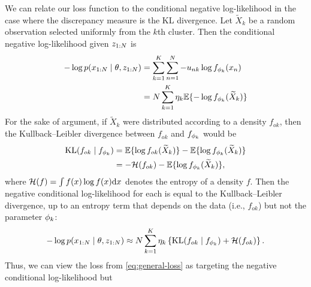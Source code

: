 We can relate our loss function to the conditional negative log-likelihood in the case where the discrepancy measure is the KL divergence.
Let $\widetilde{X}_{k}$ be a random observation selected uniformly from the $k$th cluster.
Then the conditional negative log-likelihood given $z_{1:N}$ is
\begin{align}
	-\log p(x_{1:\numobs} \mid \theta, z_{1:\numobs})
	 & = \sum_{k=1}^{\numcomps}\sum_{n=1}^N - u_{nk}\log f_{\param_{k}}(x_n)      \\
	 & = N \sum_{k=1}^{\numcomps} \eta_{k} \E\{-\log f_{\param_{k}}(\widetilde X_{k})\}
\end{align}
For the sake of argument, if $\widetilde{X}_{k}$ were distributed according to a density $f_{ok}$, then
the Kullback--Leibler divergence between $f_{ok}$ and $f_{\phi_{k}}$ would be
\[
	\begin{aligned}
		\kl{f_{ok}}{ f_{\param_{k}}}
		 & = \E\{\log f_{ok}(\widetilde X_{k})\} -  \E\{\log f_{\param_{k}}(\widetilde X_{k})\} \\
		 & = -\mathcal{H}(f_{ok}) -  \E\{\log f_{\param_{k}}(\widetilde X_{k})\},
	\end{aligned}
\]
where $\mathcal{H}(f) = \int f(x) \log f(x) \mathrm{d} x$ denotes the entropy of a density $f$.
Then the negative conditional log-likelihood for each is equal to the Kullback--Leibler divergence, up to an entropy term that depends on the data (i.e., $f_{ok}$) but not the parameter $\phi_{k}$:
\[
	-\log p(x_{1:N} \mid \theta, z_{1:N})
	\approx N \sum_{k=1}^{K}\eta_k\left\{ \mathrm{KL}(f_{ok} \mid  f_{\phi_{k}}) + \mathcal{H}(f_{ok})\right\}.
\]
Thus, we can view the loss from \cref{eq:general-loss} as targeting the negative conditional log-likelihood but
